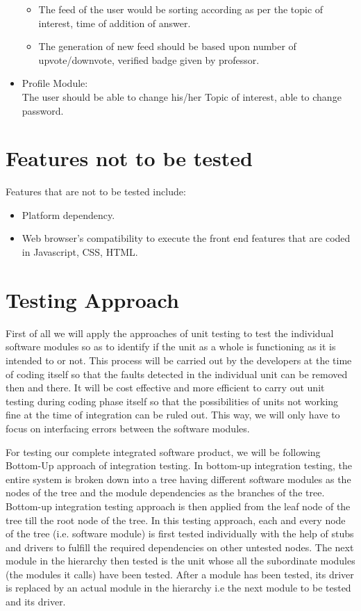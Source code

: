 \documentclass[12pt]{article}
\begin{document}
\begin{itemize}
\begin{itemize}
    \item The feed of the user would be sorting according as per the topic of interest, time of addition of answer. 
    \item The generation of new feed should be based upon number of upvote/downvote, verified badge given by professor.
\end{itemize}
    \item Profile Module:\\
The user should be able to change his/her Topic of interest, able to change password.
\end{itemize}

\section{Features not to be tested}
Features that are not to be tested include:
\begin{itemize}
    \item Platform dependency.
    \item Web browser’s compatibility to execute the front end features that are coded in Javascript, CSS, HTML.
\end{itemize}


\section{Testing Approach}
First of all we will apply the approaches of unit testing to test the individual software modules so as to identify if the unit as a whole is functioning as it is intended to or not. This process will be carried out by the developers at the time of coding itself so that the faults detected in the individual unit can be removed then and there. It will be cost effective and more efficient to carry out unit testing during coding phase itself so that the possibilities of units not working fine at the time of integration can be ruled out. This way, we will only have to focus on interfacing errors between the software modules.

For testing our complete integrated software product, we will be following Bottom-Up approach of integration testing. In bottom-up integration testing, the entire system is broken down into a tree having different software modules as the nodes of the tree and the module dependencies as the branches of the tree. Bottom-up integration testing approach is then applied from the leaf node of the tree till the root node of the tree. In this testing approach, each and every node of the tree (i.e. software module) is first tested individually with the help of stubs and drivers to fulfill the required dependencies on other untested nodes. The next module in the hierarchy then tested is the unit whose all the subordinate modules (the modules it calls) have been tested. After a module has been tested, its driver is replaced by an actual module in the hierarchy i.e the next module to be tested and its driver.
\end{document}
